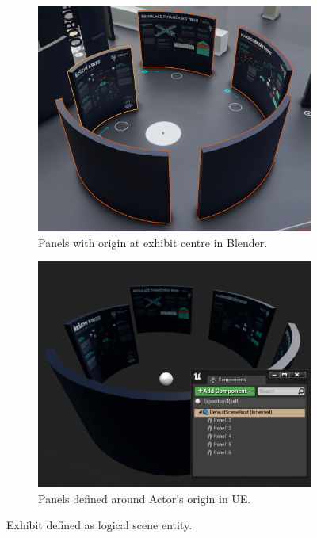 \begin{figure}[!ht]\centering
    \begin{subfigure}[b]{0.495\textwidth}
        \centering
        \includegraphics[width=\textwidth]{img/blender-exhibit.png}
        \caption{Panels with origin at exhibit centre in Blender.}
    \end{subfigure}
    \hfill
    \begin{subfigure}[b]{0.495\textwidth}
        \centering
        \includegraphics[width=\textwidth]{img/unreal-exhibit.png}
        \caption{Panels defined around Actor's origin in UE.}
    \end{subfigure}
    \caption{Exhibit defined as logical scene entity.}
    \label{fig:exhibit-definition}
\end{figure}

